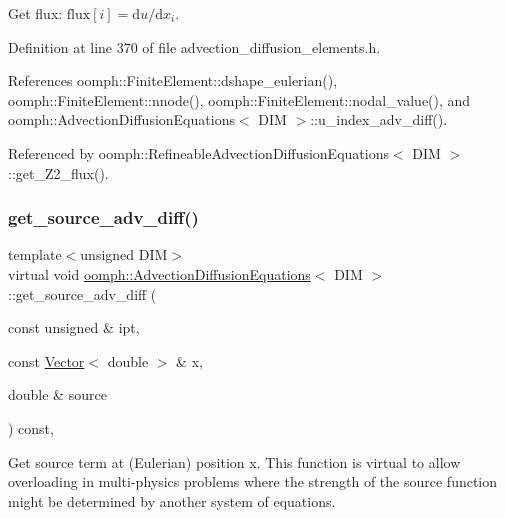 Get flux\+: $\mbox{flux}[i] = \mbox{d}u / \mbox{d}x_i $. 



Definition at line 370 of file advection\+\_\+diffusion\+\_\+elements.\+h.



References oomph\+::\+Finite\+Element\+::dshape\+\_\+eulerian(), oomph\+::\+Finite\+Element\+::nnode(), oomph\+::\+Finite\+Element\+::nodal\+\_\+value(), and oomph\+::\+Advection\+Diffusion\+Equations$<$ D\+I\+M $>$\+::u\+\_\+index\+\_\+adv\+\_\+diff().



Referenced by oomph\+::\+Refineable\+Advection\+Diffusion\+Equations$<$ D\+I\+M $>$\+::get\+\_\+\+Z2\+\_\+flux().

\mbox{\label{classoomph_1_1AdvectionDiffusionEquations_a3b8feaba7519dee3ed4a056c5dcf2bc2}} 
\subsubsection{\texorpdfstring{get\+\_\+source\+\_\+adv\+\_\+diff()}{get\_source\_adv\_diff()}}
{\footnotesize\ttfamily template$<$unsigned D\+IM$>$ \\
virtual void \hyperlink{classoomph_1_1AdvectionDiffusionEquations}{oomph\+::\+Advection\+Diffusion\+Equations}$<$ D\+IM $>$\+::get\+\_\+source\+\_\+adv\+\_\+diff (\begin{DoxyParamCaption}\item[{const unsigned \&}]{ipt,  }\item[{const \hyperlink{classoomph_1_1Vector}{Vector}$<$ double $>$ \&}]{x,  }\item[{double \&}]{source }\end{DoxyParamCaption}) const\hspace{0.3cm}{\ttfamily [inline]}, {\ttfamily [virtual]}}



Get source term at (Eulerian) position x. This function is virtual to allow overloading in multi-\/physics problems where the strength of the source function might be determined by another system of equations. 



